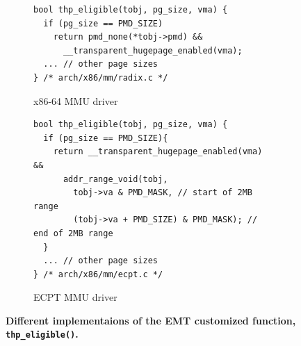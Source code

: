 


	
	

\begin{figure}
\centering
\begin{subfigure}[b]{.5\textwidth}
\begin{verbatim}
bool thp_eligible(tobj, pg_size, vma) {
  if (pg_size == PMD_SIZE) 
    return pmd_none(*tobj->pmd) &&
      __transparent_hugepage_enabled(vma);
  ... // other page sizes
} /* arch/x86/mm/radix.c */
\end{verbatim}
\captionsetup{justification=centering}
\vspace{-10pt}
\caption{x86-64 MMU driver}
\end{subfigure}
\begin{subfigure}[b]{.5\textwidth}
\begin{verbatim}
bool thp_eligible(tobj, pg_size, vma) {
  if (pg_size == PMD_SIZE){ 
    return __transparent_hugepage_enabled(vma) &&
      addr_range_void(tobj, 
        tobj->va & PMD_MASK, // start of 2MB range
        (tobj->va + PMD_SIZE) & PMD_MASK); // end of 2MB range
  }
  ... // other page sizes
} /* arch/x86/mm/ecpt.c */
\end{verbatim}
\captionsetup{justification=centering}
\vspace{-10pt}
\caption{ECPT MMU driver}
\label{emt:code:thpgen:ecpt}
\end{subfigure}
\vspace{-20pt}
\caption{\bf Different implementaions of the EMT customized function,
    \texttt{\small  thp\_eligible()}.}
\label{emt:code:thpgen}
\end{figure}

